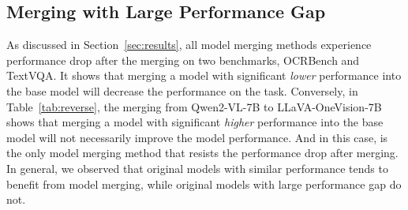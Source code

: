 

\subsection{Merging with Large Performance Gap}

As discussed in Section~\ref{sec:results}, all model merging methods experience performance drop after the merging on two benchmarks, OCRBench and TextVQA. It shows that merging a model with significant \textit{lower} performance into the base model will decrease the performance on the task. Conversely, in Table~\ref{tab:reverse}, the merging from Qwen2-VL-7B to LLaVA-OneVision-7B shows that merging a model with significant \textit{higher} performance into the base model will not necessarily improve the model performance. And in this case, \ours is the only model merging method that resists the performance drop after merging.
In general, we observed that original models with similar performance tends to benefit from model merging, while original models with large performance gap do not.

